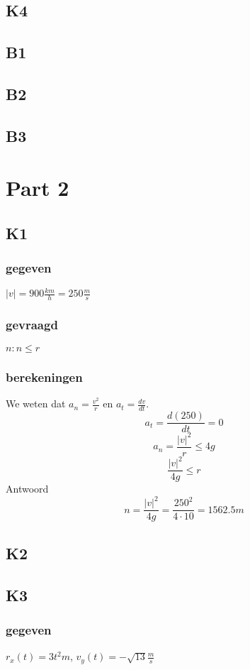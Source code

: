 \documentclass[10pt,a4paper]{article}
\begin{document}
\subsection{K4}

\subsection{B1}

\subsection{B2}

\subsection{B3}

\section{Part 2}
\subsection{K1}
\subsubsection*{gegeven}
$|v|= 900\frac{km}{h} = 250\frac{m}{s}$
\subsubsection*{gevraagd}
$n: n \le r$
\subsubsection*{berekeningen}
We weten dat $a_n=\frac{v^2}{r}$ en  $a_t = \frac{dv}{dt}$.
\[
a_t=\frac{d(250)}{dt} = 0
\]
\[
a_n = \frac{|v|^2}{r} \le 4g
\]
\[
\frac{|v|^2}{4g}\le r
\]
Antwoord
\[
n= \frac{|v|^2}{4g} = \frac{250^2}{4 \cdot 10} = 1562.5m
\]

\subsection{K2}

\subsection{K3}
\subsubsection*{gegeven}
$r_{x}(t) = 3t^{2} m$, 
$v_{y}(t)= -\sqrt{13} \frac{m}{s}$
\end{document}
